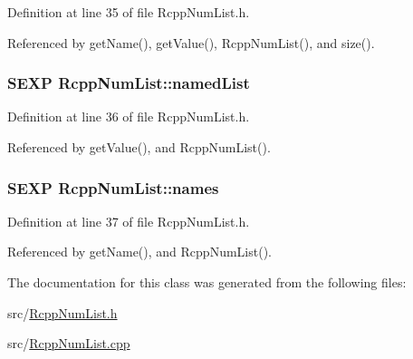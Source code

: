 Definition at line 35 of file RcppNumList.h.

Referenced by getName(), getValue(), RcppNumList(), and size().\hypertarget{classRcppNumList_a7464927aafe555a0c4a104247dba7185}{
\subsubsection[{namedList}]{\setlength{\rightskip}{0pt plus 5cm}SEXP {\bf RcppNumList::namedList}}}
\label{classRcppNumList_a7464927aafe555a0c4a104247dba7185}


Definition at line 36 of file RcppNumList.h.

Referenced by getValue(), and RcppNumList().\hypertarget{classRcppNumList_aa669b28cba0c95531a3c92910a60ecb0}{
\subsubsection[{names}]{\setlength{\rightskip}{0pt plus 5cm}SEXP {\bf RcppNumList::names}}}
\label{classRcppNumList_aa669b28cba0c95531a3c92910a60ecb0}


Definition at line 37 of file RcppNumList.h.

Referenced by getName(), and RcppNumList().

The documentation for this class was generated from the following files:\begin{DoxyCompactItemize}
\item 
src/\hyperlink{RcppNumList_8h}{RcppNumList.h}\item 
src/\hyperlink{RcppNumList_8cpp}{RcppNumList.cpp}\end{DoxyCompactItemize}
